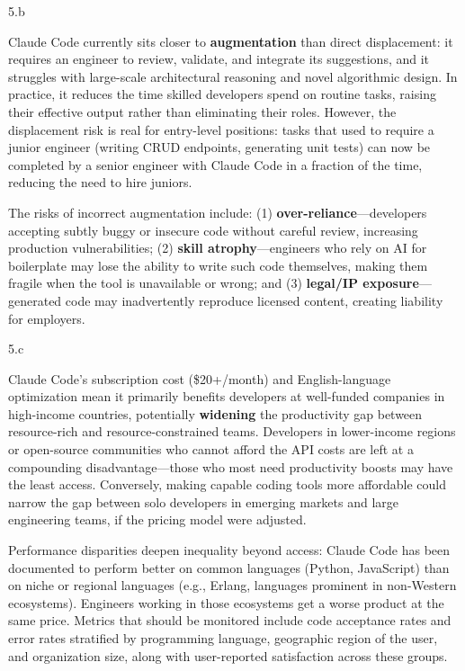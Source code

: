 \LARGE
5.b
\normalsize

\begin{answer}
  Claude Code currently sits closer to \textbf{augmentation} than direct displacement: it requires an engineer to review, validate, and integrate its suggestions, and it struggles with large-scale architectural reasoning and novel algorithmic design. In practice, it reduces the time skilled developers spend on routine tasks, raising their effective output rather than eliminating their roles. However, the displacement risk is real for entry-level positions: tasks that used to require a junior engineer (writing CRUD endpoints, generating unit tests) can now be completed by a senior engineer with Claude Code in a fraction of the time, reducing the need to hire juniors.

  The risks of incorrect augmentation include: (1) \textbf{over-reliance}---developers accepting subtly buggy or insecure code without careful review, increasing production vulnerabilities; (2) \textbf{skill atrophy}---engineers who rely on AI for boilerplate may lose the ability to write such code themselves, making them fragile when the tool is unavailable or wrong; and (3) \textbf{legal/IP exposure}---generated code may inadvertently reproduce licensed content, creating liability for employers.
\end{answer}

\LARGE
5.c
\normalsize

\begin{answer}
  Claude Code's subscription cost (\$20+/month) and English-language optimization mean it primarily benefits developers at well-funded companies in high-income countries, potentially \textbf{widening} the productivity gap between resource-rich and resource-constrained teams. Developers in lower-income regions or open-source communities who cannot afford the API costs are left at a compounding disadvantage---those who most need productivity boosts may have the least access. Conversely, making capable coding tools more affordable could narrow the gap between solo developers in emerging markets and large engineering teams, if the pricing model were adjusted.

  Performance disparities deepen inequality beyond access: Claude Code has been documented to perform better on common languages (Python, JavaScript) than on niche or regional languages (e.g., Erlang, languages prominent in non-Western ecosystems). Engineers working in those ecosystems get a worse product at the same price. Metrics that should be monitored include code acceptance rates and error rates stratified by programming language, geographic region of the user, and organization size, along with user-reported satisfaction across these groups.
\end{answer}

